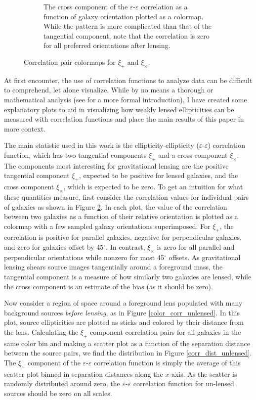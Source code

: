 \documentclass[%
 reprint,
 amsmath,amssymb,
 aps,nofootinbib
]{revtex4-1}
\begin{document}
\begin{figure}[!b]
\begin{subfigure}{0.425\textwidth}
        \captionsetup{justification=raggedright,singlelinecheck=false}
        \caption{The cross component of the $\varepsilon$-$\varepsilon$ correlation as a function of galaxy orientation plotted as a colormap. While the pattern is more complicated than that of the tangential component, note that the correlation is zero for all preferred orientations after lensing.}
        \label{xix_colormap}
    \end{subfigure}
    \caption{Correlation pair colormaps for $\xi_+$ and $\xi_\times$.}
    \label{corr_colormaps}
\end{figure}

At first encounter, the use of correlation functions to analyze data can be difficult to comprehend, let alone visualize. While by no means a thorough or mathematical analysis (see \cite{correlation_functions} for a more formal introduction), I have created some explanatory plots to aid in visualizing how weakly lensed ellipticities can be measured with correlation functions and place the main results of this paper in more context.

The main statistic used in this work is the ellipticity-ellipticity ($\varepsilon$-$\varepsilon$) correlation function, which has two tangential components $\xi_\pm$ and a cross component $\xi_\times$. The components most interesting for gravitational lensing are the positive tangential component $\xi_+$, expected to be positive for lensed galaxies, and the cross component $\xi_\times$, which is expected to be zero. To get an intuition for what these quantities measure, first consider the correlation values for individual pairs of galaxies as shown in Figure \ref{corr_colormaps}. In each plot, the value of the correlation between two galaxies as a function of their relative orientation is plotted as a colormap with a few sampled galaxy orientations superimposed. For $\xi_+$, the correlation is positive for parallel galaxies, negative for perpendicular galaxies, and zero for galaxies offset by 45$^\circ$. In contrast, $\xi_\times$ is zero for all parallel and perpendicular orientations while nonzero for most 45$^\circ$ offsets. As gravitational lensing shears source images tangentially around a foreground mass, the tangential component is a measure of how similarly two galaxies are lensed, while the cross component is an estimate of the bias (as it should be zero).

Now consider a region of space around a foreground lens populated with many background sources \textit{before lensing}, as in Figure \ref{color_corr_unlensed}. In this plot, source ellipticities are plotted as sticks and colored by their distance from the lens. Calculating the $\xi_+$ component correlation pairs for all galaxies in the same color bin and making a scatter plot as a function of the separation distance between the source pairs, we find the distribution in Figure \ref{corr_dist_unlensed}. The $\xi_+$ component of the $\varepsilon$-$\varepsilon$ correlation function is simply the average of this scatter plot binned in separation distances along the $x$-axis. As the scatter is randomly distributed around zero, the $\varepsilon$-$\varepsilon$ correlation function for un-lensed sources should be zero on all scales.
\end{document}
